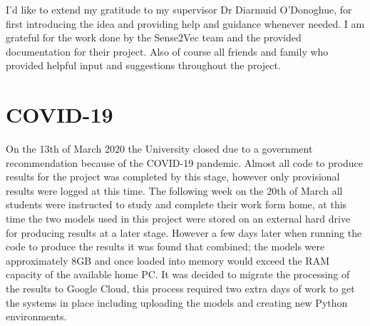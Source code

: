 I’d like to extend my gratitude to my supervisor Dr Diarmuid O'Donoghue, for first introducing the idea and providing help and guidance whenever needed. I am grateful for the work done by the Sense2Vec team and the provided documentation for their project. Also of course all friends and family who provided helpful input and suggestions throughout the project.

\section*{COVID-19}
On the 13th of March 2020 the University closed due to a government recommendation because of the COVID-19 pandemic. Almost all code to produce results for the project was completed by this stage, however only provisional results were logged at this time. The following week on the 20th of March all students were instructed to study and complete their work form home, at this time the two models used in this project were stored on an external hard drive for producing results at a later stage. However a few days later when running the code to produce the results it was found that combined; the models were approximately 8GB and once loaded into memory would exceed the RAM capacity of the available home PC. It was decided to migrate the processing of the results to Google Cloud, this process required two extra days of work to get the systems in place including uploading the models and creating new Python environments.